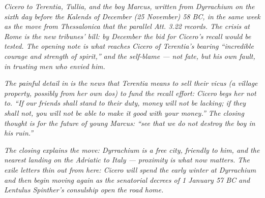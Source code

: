 
\textit{Cicero to Terentia, Tullia, and the boy Marcus, written
from Dyrrachium on the sixth day before the Kalends of
December (25 November) 58 BC, in the same week as the move
from Thessalonica that the parallel \textit{Att.} 3.22
records. The crisis at Rome is the new tribunes' bill: by
December the bid for Cicero's recall would be tested. The
opening note is what reaches Cicero of Terentia's bearing
``incredible courage and strength of spirit,'' and the
self-blame --- not fate, but his own fault, in trusting men
who envied him.}

\textit{The painful detail in  is the news that
Terentia means to sell their \textit{vicus} (a village
property, possibly from her own \textit{dos}) to fund the
recall effort: Cicero begs her not to. ``If our friends shall
stand to their duty, money will not be lacking; if they shall
not, you will not be able to make it good with your money.''
The closing thought is for the future of young Marcus: ``see
that we do not destroy the boy in his ruin.''}

\textit{The closing  explains the move:
Dyrrachium is a free city, friendly to him, and the nearest
landing on the Adriatic to Italy --- proximity is what now
matters. The exile letters thin out from here: Cicero will
spend the early winter at Dyrrachium and then begin moving
again as the senatorial decrees of 1 January 57 BC and Lentulus
Spinther's consulship open the road home.}
